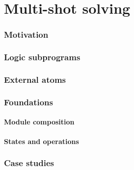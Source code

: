 \part{Multi-shot solving}
\section{Motivation}

\section{Logic subprograms}


\section{External atoms}


\section{Foundations}
\subsection{Module composition}

\subsection{States and operations}

\section{Case studies}
